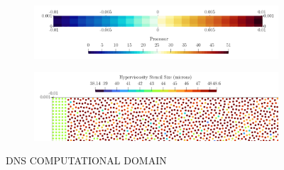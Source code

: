 \begin{figure}[t]
\centering
    \begin{subfigure}{0.99\textwidth}
    \centering
    \includegraphics[scale=0.25]{assets/graphs/flame-sim-discretisation.png}
    \caption{}
    \label{fig:disc1}
    \end{subfigure}

\vspace*{0.5em}

    \begin{subfigure}{0.99\textwidth}
    \centering
    \includegraphics[scale=0.25]{assets/graphs/flame-sim-discretisation_zoom.png}
    \caption{}
    \label{fig:disc2}
    \end{subfigure}
\caption{DNS COMPUTATIONAL DOMAIN}
\label{fig:disc}
\end{figure}




